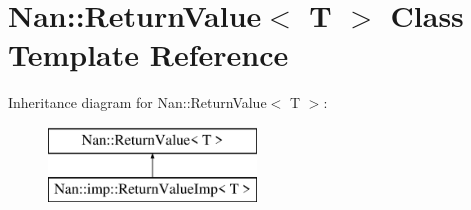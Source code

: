 \hypertarget{class_nan_1_1_return_value}{}\section{Nan\+:\+:Return\+Value$<$ T $>$ Class Template Reference}
\label{class_nan_1_1_return_value}
Inheritance diagram for Nan\+:\+:Return\+Value$<$ T $>$\+:\begin{figure}[H]
\begin{center}
\leavevmode
\includegraphics[height=2.000000cm]{class_nan_1_1_return_value}
\end{center}
\end{figure}
